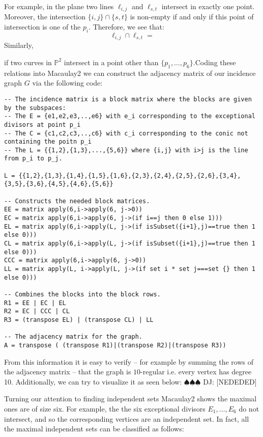 \documentclass[11pt]{amsart}
\theoremstyle{remark}
\renewcommand{\P}{\mathbb{P}}
\newcommand{\deej}[1]{{\color{red} \sf $\spadesuit\spadesuit\spadesuit$ DJ: [#1]}}
\begin{document}
For example, in the plane two lines $\ell_{i,j}$ and $\ell_{s,t}$ intersect in exactly one point. Moreover, the intersection $\{i,j\}\cap \{s,t\}$ is non-empty if and only if this point of intersection is one of the $p_i$. Therefore, we see that:
\[
\ell_{i,j}\cap \ell_{s,t}=
\]
Similarly, 

 if two curves in $\P^2$ intersect in a point other than $\{p_1,\ldots,p_6\}$.Coding these relations into Macaulay2 we can construct the adjacency matrix of our incidence graph $G$ via the following code:
\begin{verbatim}
-- The incidence matrix is a block matrix where the blocks are given by the subspaces:
-- The E = {e1,e2,e3,..,e6} with e_i corresponding to the exceptional divisors at point p_i
-- The C = {c1,c2,c3,..,c6} with c_i corresponding to the conic not containing the poitn p_i
-- The L = {{1,2},{1,3},...,{5,6}} where {i,j} with i>j is the line from p_i to p_j.
 
L = {{1,2},{1,3},{1,4},{1,5},{1,6},{2,3},{2,4},{2,5},{2,6},{3,4},{3,5},{3,6},{4,5},{4,6},{5,6}}

-- Constructs the needed block matrices.
EE = matrix apply(6,i->apply(6, j->0))
EC = matrix apply(6,i->apply(6, j->(if i==j then 0 else 1)))
EL = matrix apply(6,i->apply(L, j->(if isSubset({i+1},j)==true then 1 else 0)))
CL = matrix apply(6,i->apply(L, j->(if isSubset({i+1},j)==true then 1 else 0)))
CCC = matrix apply(6,i->apply(6, j->0))
LL = matrix apply(L, i->apply(L, j->(if set i * set j===set {} then 1 else 0)))

-- Combines the blocks into the block rows.	    
R1 = EE | EC | EL
R2 = EC | CCC | CL
R3 = (transpose EL) | (transpose CL) | LL

-- The adjacency matrix for the graph.
A = transpose ( (transpose R1)|(transpose R2)|(transpose R3))
\end{verbatim}

From this information it is easy to verify -- for example by summing the rows of the adjacency matrix -- that the graph is $10$-regular i.e. every vertex has degree 10. Additionally, we can try to visualize it as seen below:
\deej{NEDEDED}

Turning our attention to finding independent sets Macaulay2 shows the maximal ones are of size six. For example, the the six exceptional divisors $E_1,\ldots,E_6$ do not intersect, and so the corresponding vertices are an independent set. In fact, all the maximal independent sets can be classified as follows:
\end{document}
